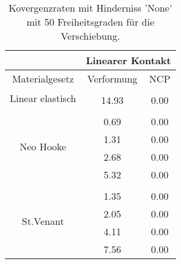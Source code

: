 \begin{table} 
\centering 
\begin{tabular}{c|cc|} 
\cline{2-3} 
 & \multicolumn{2}{|c|}{Linearer Kontakt} \\ 
\hline 
\multicolumn{1}{|c|}{Materialgesetz} & \multicolumn{1}{c|}{Verformung} & \multicolumn{1}{c|}{NCP} \\ 
\hline 
\multicolumn{1}{|c|}{\multirow{2}{*}{Linear elastisch}} &\multicolumn{1}{|c|}{} & \multicolumn{1}{|c|}{} \\ 
\multicolumn{1}{|c|}{} & \multicolumn{1}{|c|}{     14.93} & \multicolumn{1}{|c|}{      0.00} \\ 
\hline 
\multicolumn{1}{|c|}{\multirow{5}{*}{Neo Hooke}} &\multicolumn{1}{|c|}{} & \multicolumn{1}{|c|}{} \\ 
\multicolumn{1}{|c|}{} & \multicolumn{1}{|c|}{      0.69} & \multicolumn{1}{|c|}{      0.00} \\ 
\multicolumn{1}{|c|}{} & \multicolumn{1}{|c|}{      1.31} & \multicolumn{1}{|c|}{      0.00} \\ 
\multicolumn{1}{|c|}{} & \multicolumn{1}{|c|}{      2.68} & \multicolumn{1}{|c|}{      0.00} \\ 
\multicolumn{1}{|c|}{} & \multicolumn{1}{|c|}{      5.32} & \multicolumn{1}{|c|}{      0.00} \\ 
\hline 
\multicolumn{1}{|c|}{\multirow{5}{*}{St.Venant}} &\multicolumn{1}{|c|}{} & \multicolumn{1}{|c|}{} \\ 
\multicolumn{1}{|c|}{} & \multicolumn{1}{|c|}{      1.35} & \multicolumn{1}{|c|}{      0.00} \\ 
\multicolumn{1}{|c|}{} & \multicolumn{1}{|c|}{      2.05} & \multicolumn{1}{|c|}{      0.00} \\ 
\multicolumn{1}{|c|}{} & \multicolumn{1}{|c|}{      4.11} & \multicolumn{1}{|c|}{      0.00} \\ 
\multicolumn{1}{|c|}{} & \multicolumn{1}{|c|}{      7.56} & \multicolumn{1}{|c|}{      0.00} \\ 
\hline 
\end{tabular}\caption{Kovergenzraten mit Hinderniss 'None' mit 50 Freiheitsgraden für die Verschiebung.}\label{tab:Rate_None_level1}
\end{table} 

